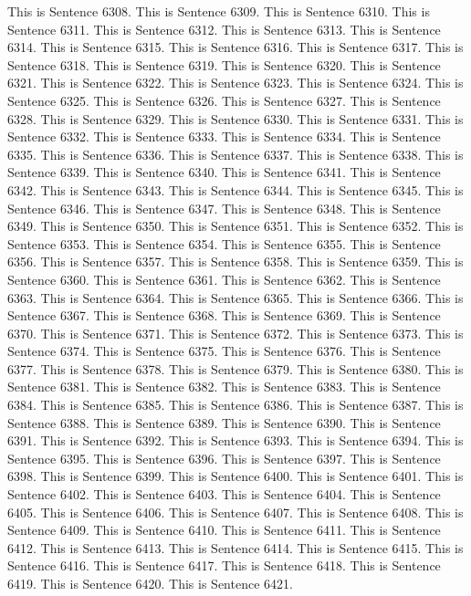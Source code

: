 \documentclass{article}
\begin{document}
This is Sentence 6308.
This is Sentence 6309.
This is Sentence 6310.
This is Sentence 6311.
This is Sentence 6312.
This is Sentence 6313.
This is Sentence 6314.
This is Sentence 6315.
This is Sentence 6316.
This is Sentence 6317.
This is Sentence 6318.
This is Sentence 6319.
This is Sentence 6320.
This is Sentence 6321.
This is Sentence 6322.
This is Sentence 6323.
This is Sentence 6324.
This is Sentence 6325.
This is Sentence 6326.
This is Sentence 6327.
This is Sentence 6328.
This is Sentence 6329.
This is Sentence 6330.
This is Sentence 6331.
This is Sentence 6332.
This is Sentence 6333.
This is Sentence 6334.
This is Sentence 6335.
This is Sentence 6336.
This is Sentence 6337.
This is Sentence 6338.
This is Sentence 6339.
This is Sentence 6340.
This is Sentence 6341.
This is Sentence 6342.
This is Sentence 6343.
This is Sentence 6344.
This is Sentence 6345.
This is Sentence 6346.
This is Sentence 6347.
This is Sentence 6348.
This is Sentence 6349.
This is Sentence 6350.
This is Sentence 6351.
This is Sentence 6352.
This is Sentence 6353.
This is Sentence 6354.
This is Sentence 6355.
This is Sentence 6356.
This is Sentence 6357.
This is Sentence 6358.
This is Sentence 6359.
This is Sentence 6360.
This is Sentence 6361.
This is Sentence 6362.
This is Sentence 6363.
This is Sentence 6364.
This is Sentence 6365.
This is Sentence 6366.
This is Sentence 6367.
This is Sentence 6368.
This is Sentence 6369.
This is Sentence 6370.
This is Sentence 6371.
This is Sentence 6372.
This is Sentence 6373.
This is Sentence 6374.
This is Sentence 6375.
This is Sentence 6376.
This is Sentence 6377.
This is Sentence 6378.
This is Sentence 6379.
This is Sentence 6380.
This is Sentence 6381.
This is Sentence 6382.
This is Sentence 6383.
This is Sentence 6384.
This is Sentence 6385.
This is Sentence 6386.
This is Sentence 6387.
This is Sentence 6388.
This is Sentence 6389.
This is Sentence 6390.
This is Sentence 6391.
This is Sentence 6392.
This is Sentence 6393.
This is Sentence 6394.
This is Sentence 6395.
This is Sentence 6396.
This is Sentence 6397.
This is Sentence 6398.
This is Sentence 6399.
This is Sentence 6400.
This is Sentence 6401.
This is Sentence 6402.
This is Sentence 6403.
This is Sentence 6404.
This is Sentence 6405.
This is Sentence 6406.
This is Sentence 6407.
This is Sentence 6408.
This is Sentence 6409.
This is Sentence 6410.
This is Sentence 6411.
This is Sentence 6412.
This is Sentence 6413.
This is Sentence 6414.
This is Sentence 6415.
This is Sentence 6416.
This is Sentence 6417.
This is Sentence 6418.
This is Sentence 6419.
This is Sentence 6420.
This is Sentence 6421.
\end{document}
